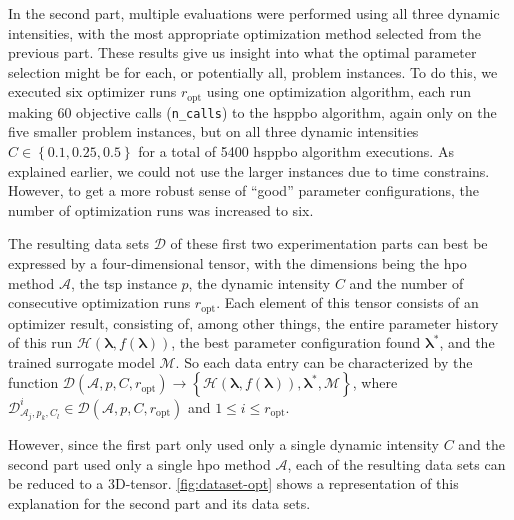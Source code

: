 In the second part, multiple evaluations were performed using all three dynamic intensities, with the most appropriate optimization method selected from the previous part. These results give us insight into what the optimal parameter selection might be for each, or potentially all, problem instances. To do this, we executed six optimizer runs $r_\text{opt}$ using one optimization algorithm, each run making 60 objective calls (\texttt{n\_calls}) to the \gls{hsppbo} algorithm, again only on the five smaller problem instances, but on all three dynamic intensities $C \in \left\lbrace 0.1,0.25,0.5 \right\rbrace$ for a total of 5400 \gls{hsppbo} algorithm executions. As explained earlier, we could not use the larger instances due to time constrains. However, to get a more robust sense of \enquote{good} parameter configurations, the number of optimization runs was increased to six.

The resulting data sets $\mathcal{D}$ of these first two experimentation parts can best be expressed by a four-dimensional tensor, with the dimensions being the \gls{hpo} method $\mathcal{A}$, the \gls{tsp} instance $p$, the dynamic intensity $C$ and the number of consecutive optimization runs $r_\text{opt}$. Each element of this tensor consists of an optimizer result, consisting of, among other things, the entire parameter history of this run $\mathcal{H}(\mathbf{\lambda}, f(\mathbf{\lambda}))$, the best parameter configuration found $\mathbf{\lambda^*}$, and the trained surrogate model $\mathcal{M}$. So each data entry can be characterized by the function $\mathcal{D}(\mathcal{A},p,C,r_\text{opt}) \to \left\lbrace \mathcal{H}(\mathbf{\lambda}, f(\mathbf{\lambda})), \mathbf{\lambda^*}, \mathcal{M} \right\rbrace $, where 	$\mathcal{D}^i_{\mathcal{A}_j,p_k,C_l} \in \mathcal{D}(\mathcal{A},p,C,r_\text{opt})$ and $1 \leq i  \leq r_\text{opt}$.

 However, since the first part only used only a single dynamic intensity $C$ and the second part used only a single \gls{hpo} method $\mathcal{A}$, each of the resulting data sets can be reduced to a 3D-tensor.
 \cref{fig:dataset-opt} shows a representation of this explanation for the second part and its data sets.

